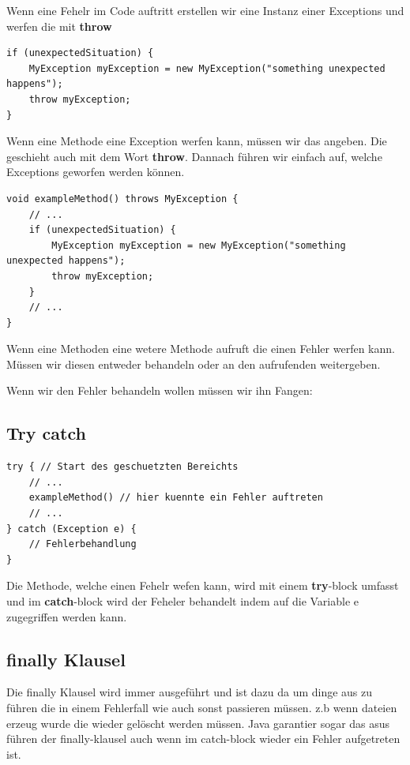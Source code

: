 \documentclass[12pt]{article}
\begin{document}
    Wenn eine Fehelr im Code auftritt erstellen wir eine Instanz einer Exceptions 
    und werfen die mit \textbf{throw}

    \begin{lstlisting}
if (unexpectedSituation) {
    MyException myException = new MyException("something unexpected happens");
    throw myException;
}
    \end{lstlisting}

    Wenn eine Methode eine Exception werfen kann, müssen wir das angeben. 
    Die geschieht auch mit dem Wort \textbf{throw}. Dannach führen wir einfach auf, welche Exceptions geworfen werden 
    können. 

    \begin{lstlisting}
void exampleMethod() throws MyException {
    // ...
    if (unexpectedSituation) {
        MyException myException = new MyException("something unexpected happens");
        throw myException;
    }
    // ...
}
    \end{lstlisting}

    Wenn eine Methoden eine wetere Methode aufruft die einen Fehler werfen kann. Müssen wir diesen entweder 
    behandeln oder an den aufrufenden weitergeben. 

    Wenn wir den Fehler behandeln wollen müssen wir ihn Fangen: 

    \subsection*{Try catch}

    \begin{lstlisting}
try { // Start des geschuetzten Bereichts
    // ...
    exampleMethod() // hier kuennte ein Fehler auftreten
    // ...
} catch (Exception e) {
    // Fehlerbehandlung
}
    \end{lstlisting}

    Die Methode, welche einen Fehelr wefen kann, wird mit einem \textbf{try}-block umfasst und 
    im \textbf{catch}-block wird der Feheler behandelt indem auf die Variable e zugegriffen werden kann. 

    \subsection*{finally Klausel}

    Die finally Klausel wird immer ausgeführt und ist dazu da um dinge aus zu führen die 
    in einem Fehlerfall wie auch sonst passieren müssen. z.b wenn dateien erzeug wurde die wieder 
    gelöscht werden müssen. 
    Java garantier sogar das asus führen der finally-klausel auch wenn im catch-block wieder ein Fehler aufgetreten ist. 
\end{document}
